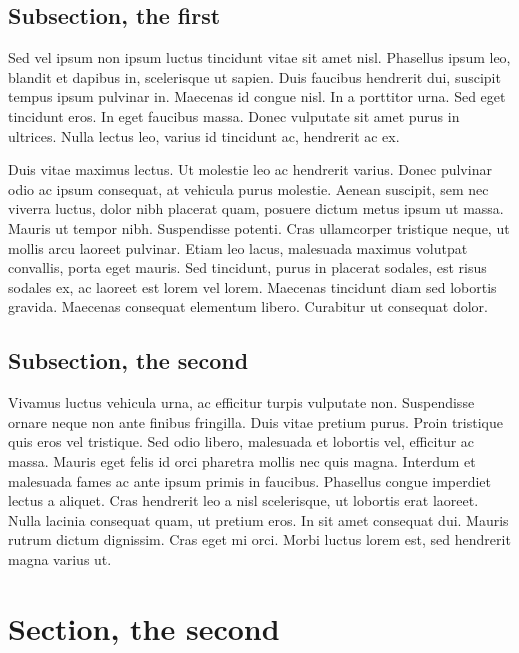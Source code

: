\subsection{Subsection, the first}

Sed vel ipsum non ipsum luctus tincidunt vitae sit amet nisl. Phasellus ipsum leo,
blandit et dapibus in, scelerisque ut sapien. Duis faucibus hendrerit dui, suscipit
tempus ipsum pulvinar in. Maecenas id congue nisl. In a porttitor urna. Sed eget
tincidunt eros. In eget faucibus massa. Donec vulputate sit amet purus in ultrices.
Nulla lectus leo, varius id tincidunt ac, hendrerit ac ex.

Duis vitae maximus lectus. Ut molestie leo ac hendrerit varius. Donec pulvinar odio ac
ipsum consequat, at vehicula purus molestie. Aenean suscipit, sem nec viverra luctus,
dolor nibh placerat quam, posuere dictum metus ipsum ut massa. Mauris ut tempor nibh.
Suspendisse potenti. Cras ullamcorper tristique neque, ut mollis arcu laoreet pulvinar.
Etiam leo lacus, malesuada maximus volutpat convallis, porta eget mauris. Sed tincidunt,
purus in placerat sodales, est risus sodales ex, ac laoreet est lorem vel lorem.
Maecenas tincidunt diam sed lobortis gravida. Maecenas consequat elementum libero.
Curabitur ut consequat dolor.

\subsection{Subsection, the second}

Vivamus luctus vehicula urna, ac efficitur turpis vulputate non. Suspendisse ornare
neque non ante finibus fringilla. Duis vitae pretium purus. Proin tristique quis eros
vel tristique. Sed odio libero, malesuada et lobortis vel, efficitur ac massa. Mauris
eget felis id orci pharetra mollis nec quis magna. Interdum et malesuada fames ac ante
ipsum primis in faucibus. Phasellus congue imperdiet lectus a aliquet. Cras hendrerit
leo a nisl scelerisque, ut lobortis erat laoreet. Nulla lacinia consequat quam, ut
pretium eros. In sit amet consequat dui. Mauris rutrum dictum dignissim. Cras eget mi
orci. Morbi luctus lorem est, sed hendrerit magna varius ut.

\section{Section, the second}

